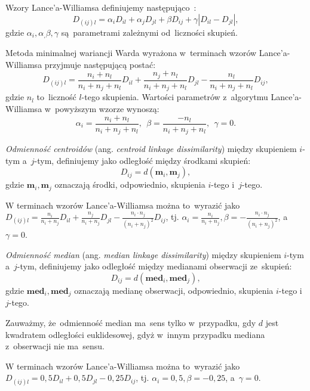 \documentclass{praca1}
\begin{document}
\begin{definition}
Wzory Lance'a-Williamsa definiujemy następująco~\cite{Lance1967:hierarchical}:
$$
D_{(ij)l} = \alpha_i D_{il} + \alpha_j D_{jl} + \beta D_{ij} + \gamma |D_{il} - D_{jl}|,
$$
gdzie $\alpha_i, \alpha_, \beta, \gamma$ są~parametrami zależnymi od~liczności skupień.
\end{definition}

Metoda minimalnej wariancji Warda wyrażona w~terminach wzorów Lance'a-Williamsa przyjmuje następującą postać:
$$
D_{(ij)l} = \frac{n_i+n_l}{n_i+n_j+n_l} D_{il} + \frac{n_j+n_l}{n_i+n_j+n_l} D_{jl} - \frac{n_l}{n_i+n_j+n_l} D_{ij},
$$
gdzie $n_l$ to~liczność $l$-tego skupienia. Wartości parametrów z~algorytmu Lance'a-Williamsa w~powyższym wzorze wynoszą:
$$
\alpha_i =  \frac{n_i+n_l}{n_i+n_j+n_l},\ \ \beta = \frac{-n_l}{n_i+n_j+n_l},\ \ \gamma = 0.
$$

\begin{definition}
\emph{Odmienność centroidów} (ang. \emph{centroid linkage dissimilarity}) między skupieniem $i$-tym a~$j$-tym, definiujemy jako odległość między środkami skupień:
$$
D_{ij} = d(\mathbf{m}_i, \mathbf{m}_j),
$$
gdzie $\mathbf{m}_i, \mathbf{m}_j$ oznaczają środki, odpowiednio, skupienia $i$-tego i~$j$-tego.
\end{definition}

W terminach wzorów Lance'a-Williamsa można to~wyrazić jako $D_{(ij)l} = \frac{n_i}{n_i + n_j} D_{il} + \frac{n_j}{n_i + n_j} D_{jl} - \frac{n_i \cdot n_j}{(n_i + n_j)^2} D_{ij} $, tj. $\alpha_i = \frac{n_i}{n_i + n_j}, \beta = - \frac{n_i \cdot n_j}{(n_i + n_j)^2}$, a~$\gamma = 0$.

\begin{definition}
\emph{Odmienność median} (ang. \emph{median linkage dissimilarity}) między skupieniem $i$-tym a~$j$-tym, definiujemy jako odległość między medianami obserwacji ze~skupień:
$$
D_{ij} = d(\mathbf{med}_i, \mathbf{med}_j),
$$
gdzie $\mathbf{med}_i, \mathbf{med}_j$ oznaczają medianę obserwacji, odpowiednio, skupienia $i$-tego i~$j$-tego.
\end{definition}

Zauważmy, że~odmienność median ma~sens tylko w~przypadku, gdy $d$ jest kwadratem odległości euklidesowej, gdyż w~innym przypadku mediana z~obserwacji nie ma~sensu.

W terminach wzorów Lance'a-Williamsa można to~wyrazić jako $D_{(ij)l} = 0,5 D_{il} + 0,5 D_{jl} - 0,25 D_{ij} $, tj. $\alpha_i = 0,5, \beta = -0,25$, a~$\gamma = 0$.
\end{document}
